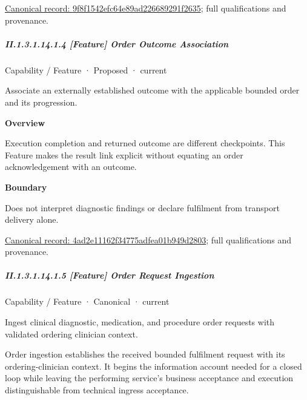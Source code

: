 {\footnotesize \href{../../../../continuum/strategy/capability/feature/9f8f1542efc64e89ad226689291f2635.md}{Canonical record: 9f8f1542efc64e89ad226689291f2635}; full qualifications and provenance.}\par
\subparagraph*{II.1.3.1.14.1.4 [Feature] Order Outcome Association}
\label{navigation:II.1.3.1.14.1.4}

\label{element:4ad2e11162f34775adfea01b949d2803}
{\small Capability / Feature · Proposed · current}\par

Associate an externally established outcome with the applicable bounded order and its progression.



\textbf{Overview}



Execution completion and returned outcome are different checkpoints. This Feature makes the result link explicit without equating an order acknowledgement with an outcome.



\textbf{Boundary}



Does not interpret diagnostic findings or declare fulfilment from transport delivery alone.


{\footnotesize \href{../../../../continuum/strategy/capability/feature/4ad2e11162f34775adfea01b949d2803.md}{Canonical record: 4ad2e11162f34775adfea01b949d2803}; full qualifications and provenance.}\par
\subparagraph*{II.1.3.1.14.1.5 [Feature] Order Request Ingestion}
\label{navigation:II.1.3.1.14.1.5}

\label{element:fc1f8168fd6949beb810e4ff57a2368e}
{\small Capability / Feature · Canonical · current}\par

Ingest clinical diagnostic, medication, and procedure order requests with validated ordering clinician context.



Order ingestion establishes the received bounded fulfilment request with its ordering-clinician context. It begins the information account needed for a closed loop while leaving the performing service's business acceptance and execution distinguishable from technical ingress acceptance.


